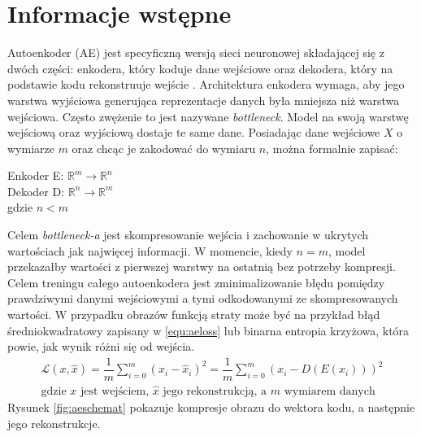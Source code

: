 \documentclass[a4paper,12pt,oneside]{book} %
\begin{document}
\section{Informacje wstępne}
Autoenkoder (AE) jest specyficzną wersją sieci neuronowej składającej się z dwóch części: enkodera, który koduje dane wejściowe oraz dekodera, który na podstawie kodu rekonstruuje wejście \cite{bank2021autoencoders}. Architektura enkodera wymaga, aby jego warstwa wyjściowa generująca reprezentacje danych była mniejsza niż warstwa wejściowa. Często zwężenie to jest nazywane \textit{bottleneck}. Model na swoją warstwę wejściową oraz wyjściową dostaje te same dane. Posiadając dane wejściowe $X$ o wymiarze $m$ oraz chcąc je zakodować do wymiaru $n$, można formalnie zapisać:

\begin{center}
	Enkoder E: $\mathbb{R}^m \rightarrow \mathbb{R}^n$\\
	Dekoder D: $\mathbb{R}^n \rightarrow \mathbb{R}^m$\\
	gdzie $n < m$\\
\end{center}
Celem \textit{bottleneck-a} jest skompresowanie wejścia i zachowanie w ukrytych wartościach jak najwięcej informacji. W momencie, kiedy $n = m$, model przekazałby wartości z pierwszej warstwy na ostatnią bez potrzeby kompresji. Celem treningu całego autoenkodera jest zminimalizowanie błędu pomiędzy prawdziwymi danymi wejściowymi a tymi odkodowanymi ze skompresowanych wartości. W przypadku obrazów funkcją straty może być na przykład błąd średniokwadratowy zapisany w \ref{equ:aeloss} lub binarna entropia krzyżowa, która powie, jak wynik różni się od wejścia. 
 \begin{equation}
 	\begin{aligned}
 		 \mathcal{L}(x, \hat{x}) = \dfrac{1}{m}\displaystyle\sum_{i=0}^{m}(x_i-\hat{x}_i)^2 =\dfrac{1}{m}\displaystyle\sum_{i=0}^{m}(x_i-D(E(x_i)))^2\\[1ex]
 		\text{gdzie $x$ jest wejściem, $\hat{x}$ jego rekonstrukcją, a $m$ wymiarem danych}
 		 \label{equ:aeloss}
 	\end{aligned}
 \end{equation}
Rysunek \ref{fig:aeschemat} \cite{bank2021autoencoders} pokazuje kompresje obrazu do wektora kodu, a następnie jego rekonstrukcje.
\end{document}
